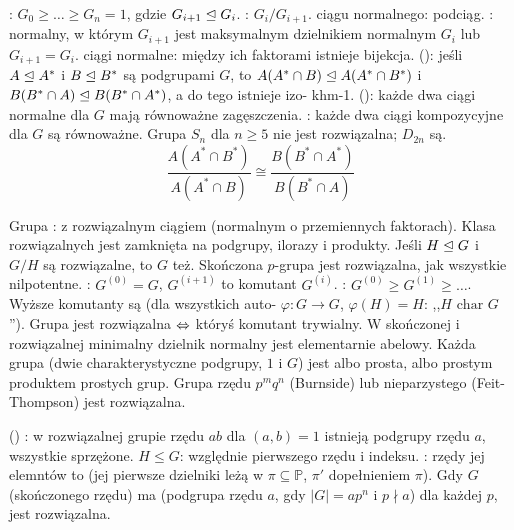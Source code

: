 :  $G_0 \ge \ldots \ge G_n = 1$, gdzie $G_{i+1} \trianglelefteq G_i$.
: $G_i / G_{i+1}$.
  ciągu normalnego: podciąg.
: normalny, w którym $G_{i+1}$ jest maksymalnym dzielnikiem normalnym $G_i$ lub $G_{i+1} = G_i$.
 ciągi normalne: między ich faktorami istnieje bijekcja.
 (): jeśli $A \trianglelefteq A^*$ i $B \trianglelefteq B^*$ są podgrupami $G$, to $A(A^* \cap B) \trianglelefteq A(A^* \cap B^*)$ i $B(B^* \cap A) \trianglelefteq B(B^* \cap A^*)$, a do tego istnieje izo- khm-1.
 (): każde dwa ciągi normalne dla $G$ mają równoważne zagęszczenia.
: każde dwa ciągi kompozycyjne dla $G$ są równoważne.
Grupa $S_n$ dla $n \ge 5$ nie jest rozwiązalna; $D_{2n}$ są.
\[
	\frac{A(A^* \cap B^*)}{A(A^* \cap B)} \cong \frac{B(B^* \cap A^*)}{B(B^* \cap A)} 
\]

Grupa :  z rozwiązalnym ciągiem (normalnym o przemiennych faktorach).
Klasa rozwiązalnych jest zamknięta na podgrupy, ilorazy i produkty.
Jeśli $H \trianglelefteq G$ i $G/H$ są rozwiązalne, to $G$ też.
Skończona $p$-grupa jest rozwiązalna, jak wszystkie nilpotentne.
: $G^{(0)} = G$, $G^{(i+1)}$ to komutant $G^{(i)}$.
: $G^{(0)} \ge G^{(1)} \ge \ldots$.
Wyższe komutanty są  (dla wszystkich auto- $\varphi \colon G \to G$, $\varphi(H) = H$: ,,$H \textrm{ char } G$'').
Grupa jest rozwiązalna $\Leftrightarrow$ któryś komutant trywialny.
W skończonej i rozwiązalnej minimalny dzielnik normalny jest elementarnie abelowy.
Każda  grupa (dwie charakterystyczne podgrupy, $1$ i $G$) jest albo prosta, albo prostym produktem prostych grup.
Grupa rzędu $p^mq^n$ (Burnside) lub nieparzystego (Feit-Thompson) jest rozwiązalna. %

 () : w rozwiązalnej grupie rzędu $ab$ dla $(a,b) = 1$ istnieją podgrupy rzędu $a$, wszystkie sprzężone.
 $H \le G$: względnie pierwszego rzędu i indeksu.
: rzędy jej elemntów to  (jej pierwsze dzielniki leżą w $\pi \subseteq \mathbb P$, $\pi'$ dopełnieniem $\pi$).
Gdy $G$ (skończonego rzędu) ma  (podgrupa rzędu $a$, gdy $|G| = ap^n$ i $p \nmid a$) dla każdej $p$, jest rozwiązalna.

